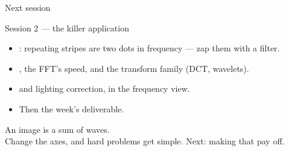 \documentclass[10pt,aspectratio=169]{beamer}
\begin{document}
\begin{frame}{Next session}
  \begin{alertblock}{Session 2 — the killer application}
    \begin{itemize}
      \item {}: repeating stripes are two dots in frequency — zap them with a
             filter.
      \item {}, the FFT's speed, and the transform family (DCT, wavelets).
      \item {} and  lighting correction, in the frequency view.
      \item Then the week's deliverable.
    \end{itemize}
  \end{alertblock}
\end{frame}

\begin{frame}[standout]
  An image is a sum of waves.\\[4pt]
  \normalsize Change the axes, and hard problems get simple. Next: making that pay off.
\end{frame}
\end{document}
